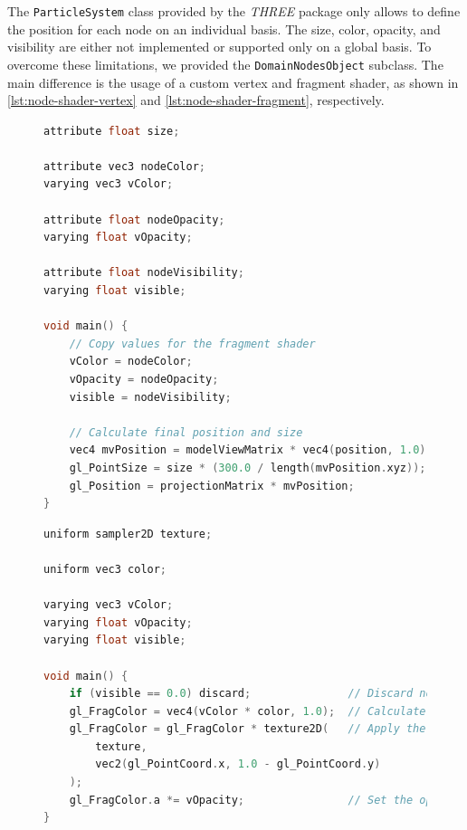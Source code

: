 The \texttt{ParticleSystem} class provided by the \emph{THREE} package only allows to define the position for each node on an individual basis. The size, color, opacity, and visibility are either not implemented or supported only on a global basis. To overcome these limitations, we provided the \texttt{DomainNodesObject} subclass. The main difference is the usage of a custom vertex and fragment shader, as shown in \vref{lst:node-shader-vertex} and \vref{lst:node-shader-fragment}, respectively.

\begin{figure}
\begin{lstlisting}[caption={Custom vertex shader for the \texttt{DomainNodesObject} (GLSL).},label=lst:node-shader-vertex,language=c]
attribute float size;

attribute vec3 nodeColor;
varying vec3 vColor;

attribute float nodeOpacity;
varying float vOpacity;

attribute float nodeVisibility;
varying float visible;

void main() {
    // Copy values for the fragment shader
    vColor = nodeColor;
    vOpacity = nodeOpacity;
    visible = nodeVisibility;

    // Calculate final position and size
    vec4 mvPosition = modelViewMatrix * vec4(position, 1.0);
    gl_PointSize = size * (300.0 / length(mvPosition.xyz));
    gl_Position = projectionMatrix * mvPosition;
}
\end{lstlisting}
\end{figure}

\begin{figure}
\begin{lstlisting}[caption={Custom fragment shader for the \texttt{DomainNodesObject} (GLSL).},label=lst:node-shader-fragment,language=c]
uniform sampler2D texture;

uniform vec3 color;

varying vec3 vColor;
varying float vOpacity;
varying float visible;

void main() {
    if (visible == 0.0) discard;               // Discard node if not visible
    gl_FragColor = vec4(vColor * color, 1.0);  // Calculate resulting color
    gl_FragColor = gl_FragColor * texture2D(   // Apply the texture
        texture,
        vec2(gl_PointCoord.x, 1.0 - gl_PointCoord.y)
    );
    gl_FragColor.a *= vOpacity;                // Set the opacity
}
\end{lstlisting}
\end{figure}

